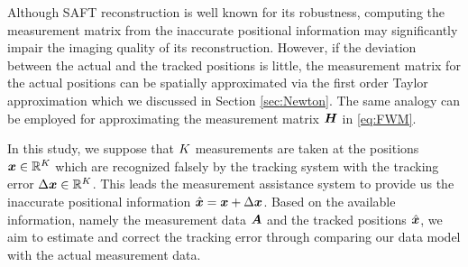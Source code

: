 Although SAFT reconstruction is well known for its robustness, computing the measurement matrix from the inaccurate positional information may significantly impair the imaging quality of its reconstruction. However, if the deviation between the actual and the tracked positions is little, the measurement matrix for the actual positions can be spatially approximated via the first order Taylor approximation which we discussed in Section \ref{sec:Newton}. %
%
The same analogy can be employed for approximating the measurement matrix $\bm{H}$ in \eqref{eq:FWM}.\par

In this study, we suppose that $K$ measurements are taken at the positions $\bm{x} \in {\mathbb{R}}^{K}$ which are recognized falsely by the tracking system with the tracking error $\Delta \bm{x} \in {\mathbb{R}}^{K}$. This leads the measurement assistance system to provide us the inaccurate positional information $\hat{\bm{x}} = \bm{x} + \Delta \bm{x}$. Based on the available information, namely the measurement data $\bm{A}$ and the tracked positions $\hat{\bm{x}}$, we aim to estimate and correct the tracking error through comparing our data model with the actual measurement data. \par

